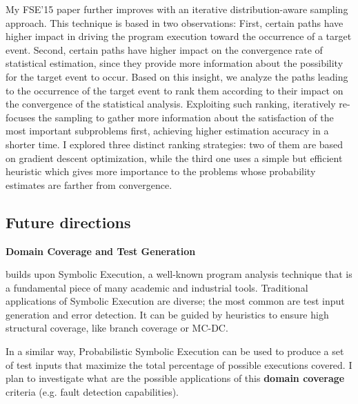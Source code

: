 \documentclass[12pt]{article}
\newcounter{list}
\begin{document}
My FSE'15 paper \cite{borges2015iterative} further improves \qCORAL
with an iterative distribution-aware sampling approach. This technique
is based in two observations: First, certain paths have higher impact
in driving the program execution toward the occurrence of a target
event. Second, certain paths have higher impact on the convergence
rate of statistical estimation, since they provide more information
about the possibility for the target event to occur. Based on this
insight, we analyze the paths leading to the occurrence of the target
event to rank them according to their impact on the convergence of the
statistical analysis.  Exploiting such ranking, \qCORAL{} iteratively
re-focuses the sampling to gather more information about the
satisfaction of the most important subproblems first, achieving higher
estimation accuracy in a shorter time. I explored three distinct
ranking strategies: two of them are based on gradient descent
optimization, while the third one uses a simple but efficient
heuristic which gives more importance to the problems whose
probability estimates are farther from convergence.


\subsection*{Future directions}

\noindent \textbf{Domain Coverage and Test Generation} 

\PSE{} builds upon Symbolic Execution, a well-known program analysis
technique that is a fundamental piece of many academic and industrial
tools. Traditional applications of Symbolic Execution are diverse; the
most common are test input generation and error detection. It can be
guided by heuristics to ensure high structural coverage, like branch
coverage or MC-DC.

In a similar way, Probabilistic Symbolic Execution can be used to
produce a set of test inputs that maximize the total percentage of
possible executions covered. I plan to investigate what are the
possible applications of this \textbf{domain coverage} criteria (e.g.
fault detection capabilities).



  
\end{document}

